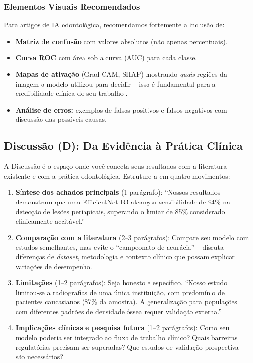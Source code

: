 \subsubsection{Elementos Visuais Recomendados}

Para artigos de IA odontológica, recomendamos fortemente a inclusão de:

\begin{itemize}
  \item \textbf{Matriz de confusão} com valores absolutos (não apenas
    percentuais).
  \item \textbf{Curva ROC} com área sob a curva (AUC) para cada classe.
  \item \textbf{Mapas de ativação} (Grad-CAM, SHAP) mostrando \textit{quais}
    regiões da imagem o modelo utilizou para decidir -- isso é fundamental para
    a credibilidade clínica do seu trabalho \cite{selvaraju2017grad}.
  \item \textbf{Análise de erros:} exemplos de falsos positivos e falsos
    negativos com discussão das possíveis causas.
\end{itemize}

\subsection{Discussão (D): Da Evidência à Prática Clínica}

A Discussão é o espaço onde você conecta seus resultados com a literatura
existente e com a prática odontológica. Estruture-a em quatro movimentos:

\begin{enumerate}
  \item \textbf{Síntese dos achados principais} (1 parágrafo): ``Nossos
    resultados demonstram que uma EfficientNet-B3 alcançou sensibilidade de 94\%
    na detecção de lesões periapicais, superando o limiar de 85\% considerado
    clinicamente aceitável.''

  \item \textbf{Comparação com a literatura} (2--3 parágrafos): Compare seu
    modelo com estudos semelhantes, mas evite o ``campeonato de acurácia'' --
    discuta diferenças de \textit{dataset}, metodologia e contexto clínico que
    possam explicar variações de desempenho.

  \item \textbf{Limitações} (1--2 parágrafos): Seja honesto e específico.
    ``Nosso estudo limitou-se a radiografias de uma única instituição, com
    predomínio de pacientes caucasianos (87\% da amostra). A generalização para
    populações com diferentes padrões de densidade óssea requer validação
    externa.''

  \item \textbf{Implicações clínicas e pesquisa futura} (1--2 parágrafos):
    Como seu modelo poderia ser integrado ao fluxo de trabalho clínico? Quais
    barreiras regulatórias precisam ser superadas? Que estudos de validação
    prospectiva são necessários?
\end{enumerate}

